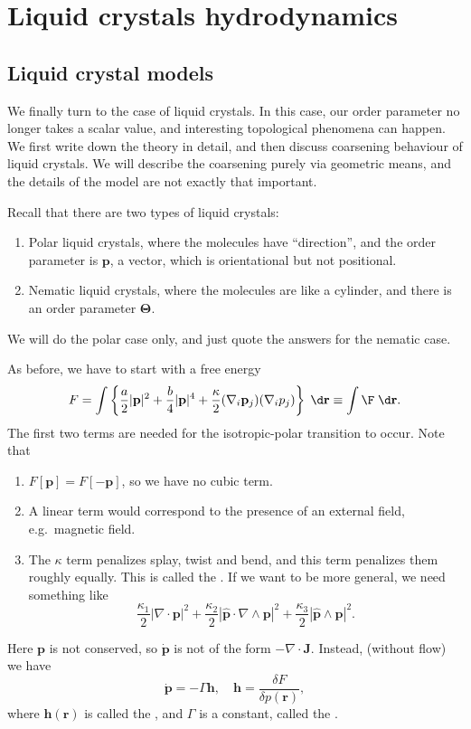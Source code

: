 \documentclass[a4paper]{article}
\begin{document}

\section{Liquid crystals hydrodynamics}
\subsection{Liquid crystal models}
We finally turn to the case of liquid crystals. In this case, our order parameter no longer takes a scalar value, and interesting topological phenomena can happen. We first write down the theory in detail, and then discuss coarsening behaviour of liquid crystals. We will describe the coarsening purely via geometric means, and the details of the model are not exactly that important.

Recall that there are two types of liquid crystals:
\begin{enumerate}
  \item Polar liquid crystals, where the molecules have ``direction'', and the order parameter is $\mathbf{p}$, a vector, which is orientational but not positional.
  \item Nematic liquid crystals, where the molecules are like a cylinder, and there is an order parameter $\boldsymbol\Theta$.
\end{enumerate}

We will do the polar case only, and just quote the answers for the nematic case.

As before, we have to start with a free energy
\[
  F = \int \left\{\frac{a}{2} |\mathbf{p}|^2 + \frac{b}{4} |\mathbf{p}|^4 + \frac{\kappa}{2} (\nabla_i \mathbf{p}_j)(\nabla_i p_j)\right\}\;\d \mathbf{r} \equiv \int \F \;\d \mathbf{r}.
\]
The first two terms are needed for the isotropic-polar transition to occur. Note that
\begin{enumerate}
  \item $F[\mathbf{p}] = F[-\mathbf{p}]$, so we have no cubic term.
  \item A linear term would correspond to the presence of an external field, e.g.\ magnetic field.
  \item The $\kappa$ term penalizes splay, twist and bend, and this term penalizes them roughly equally. This is called the . If we want to be more general, we need something like
    \[
      \frac{\kappa_1}{2} |\nabla \cdot \mathbf{p}|^2 + \frac{\kappa_2}{2} |\hat{\mathbf{p}} \cdot \nabla \wedge \mathbf{p}|^2 + \frac{\kappa_3}{2} |\hat{\mathbf{p}} \wedge \mathbf{p}|^{2}.
    \]
\end{enumerate}
Here $\mathbf{p}$ is not conserved, so $\dot{\mathbf{p}}$ is not of the form $-\nabla \cdot \mathbf{J}$. Instead, (without flow) we have
\[
  \dot{\mathbf{p}} = - \Gamma \mathbf{h},\quad \mathbf{h} = \frac{\delta F}{\delta p(\mathbf{r})},
\]
where $\mathbf{h}(\mathbf{r})$ is called the , and $\Gamma$ is a constant, called the .
\end{document}
